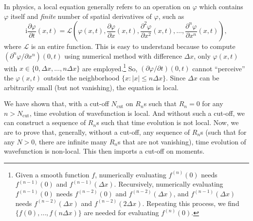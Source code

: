 \documentclass{book}
\newcommand{\mathi}{\mathrm{i}}
\newcommand{\tmem}[1]{{\em #1\/}}
\newcommand{\tmop}[1]{\ensuremath{\operatorname{#1}}}
\begin{document}
In physics, a local equation generally refers to an operation on $\varphi$
which contains $\varphi$ itself and {\tmem{finite}} number of spatial
derivatives of $\varphi$, such as
\[ \mathi \frac{\partial \varphi}{\partial t}  (x, t) =\mathcal{L} \left(
   \varphi (x, t), \frac{\partial \varphi}{\partial x} (x, t),
   \frac{\partial^2 \varphi}{\partial x^2} (x, t), \ldots, \frac{\partial^n
   \varphi}{\partial x^n} (x, t) \right), \]
where $\mathcal{L}$ is an entire function. This is easy to understand because
to compute $(\partial^n \varphi / \partial x^n) (0, t)$ using numerical method
with difference $\Delta x$, only $\varphi (x, t)$ with $x \in \{0, \Delta x,
\ldots, n \Delta x\}$ are employed.\footnote{Given a smooth function $f$,
numerically evaluating $f^{(n)} (0)$ needs $f^{(n - 1)} (0)$ and $f^{(n - 1)}
(\Delta x)$. Recursively, numerically evaluating $f^{(n - 1)} (0)$ needs
$f^{(n - 2)} (0)$ and $f^{(n - 2)} (\Delta x)$, and $f^{(n - 1)} (\Delta x)$
needs $f^{(n - 2)} (\Delta x)$ and $f^{(n - 2)} (2 \Delta x)$. Repeating this
process, we find $\{f (0), \ldots, f (n \Delta x)\}$ are needed for evaluating
$f^{(n)} (0)$.} So, $(\partial \varphi / \partial t) (0, t)$ cannot
``perceive'' the $\varphi (x, t)$ outside the neighborhood $\{x : |x|
\leqslant n \Delta x\}$. Since $\Delta x$ can be arbitrarily small (but not
vanishing), the equation is local.

We have shown that, with a cut-off $N_{\tmop{cut}}$ on $R_n$s such that $R_n =
0$ for any $n > N_{\tmop{cut}}$, time evolution of wavefunction is local. And
without such a cut-off, we can construct a sequence of $R_n$s such that time
evolution is not local. Now, we are to prove that, generally, without a
cut-off, any sequence of $R_n$s (such that for any $N > 0$, there are infinite
many $R_n$s that are not vanishing), time evolution of wavefunction is
non-local. This then imports a cut-off on moments.
\end{document}

